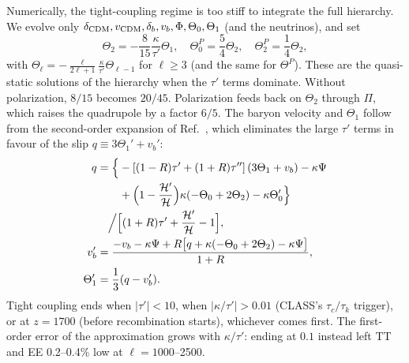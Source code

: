 Numerically, the tight-coupling regime is too stiff to integrate the full hierarchy. We evolve only
$\delta_{\rm CDM},v_{\rm CDM},\delta_b,v_b,\Phi,\Theta_0,\Theta_1$ (and the neutrinos), and set
\begin{equation}
\Theta_2 = -\frac{8}{15}\frac{\kappa}{\tau'}\Theta_1, \quad \Theta^P_0=\frac54\Theta_2, \quad \Theta^P_2=\frac14\Theta_2,
\end{equation}
with $\Theta_\ell=-\frac{\ell}{2\ell+1}\frac{\kappa}{\tau'}\Theta_{\ell-1}$ for $\ell\ge3$ (and the same for
$\Theta^P$). These are the quasi-static solutions of the hierarchy when the $\tau'$ terms dominate. Without polarization,
$8/15$ becomes $20/45$. Polarization feeds back on $\Theta_2$ through $\Pi$, which raises the quadrupole by a factor
$6/5$. The baryon velocity and $\Theta_1$ follow from the second-order expansion of Ref.~\cite{Callin2006}, which
eliminates the large $\tau'$ terms in favour of the slip $q\equiv3\Theta_1'+v_b'$:
\begin{align}
q &= \Big\{-[(1-R)\tau'+(1+R)\tau'']\,(3\Theta_1+v_b) - \kappa\Psi \nonumber\\
  &\qquad + \Big(1-\frac{\mathcal{H}'}{\mathcal{H}}\Big)\kappa(-\Theta_0+2\Theta_2) - \kappa\Theta_0'\Big\} \nonumber\\
  &\quad \Big/\Big[(1+R)\tau'+\frac{\mathcal{H}'}{\mathcal{H}}-1\Big], \nonumber\\
v_b' &= \frac{-v_b - \kappa\Psi + R\big[q + \kappa(-\Theta_0+2\Theta_2) - \kappa\Psi\big]}{1+R}, \nonumber\\
\Theta_1' &= \frac{1}{3}(q - v_b').
\end{align}
Tight coupling ends when $|\tau'|<10$, when $|\kappa/\tau'|>0.01$ (CLASS's $\tau_c/\tau_k$ trigger), or at $z=1700$
(before recombination starts), whichever comes first. The first-order error of the approximation grows with
$\kappa/\tau'$: ending at $0.1$ instead left TT and EE 0.2--0.4\% low at $\ell=1000$--2500.

